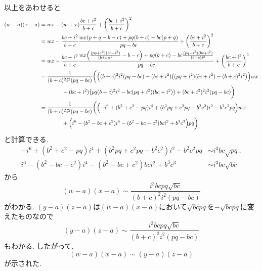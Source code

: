 \begin{ifsol*}
以上をあわせると
\begin{align*}
(w-a)(x-a)
&=wx-(w+x)\frac{bc+i^2}{b+c}+\biggl(\frac{bc+i^2}{b+c}\biggr)^2\\
&=wx-\frac{bc+i^2}{b+c}\frac{wx(p+q-b-c)+pq(b+c)-bc(p+q)}{pq-bc}+\biggl(\frac{bc+i^2}{b+c}\biggr)^2\\
&=wx-\frac{bc+i^2}{b+c}\frac{wx\Bigl(\frac{(pq+i^2)(bc+i^2)}{(b+c)i^2}-b-c\Bigr)+pq(b+c)-bc\frac{(pq+i^2)(bc+i^2)}{(b+c)i^2}}{pq-bc}+\biggl(\frac{bc+i^2}{b+c}\biggr)^2\\
&=\frac 1{(b+c)^2i^2(pq-bc)}\biggl(\Bigl((b+c)^2i^2(pq-bc)-(bc+i^2)\bigl((pq+i^2)(bc+i^2)-(b+c)^2i^2\bigr)\Bigr)wx\\
&\qquad\qquad-(bc+i^2)\bigl(pq(b+c)^2i^2-bc(pq+i^2)(bc+i^2)\bigr)+(bc+i^2)^2i^2(pq-bc)\biggr)\\
&=\frac 1{(b+c)^2i^2(pq-bc)}\biggl(\Bigl(-i^6+(b^2+c^2-pq)i^4+(b^2pq+c^2pq-b^2c^2)i^2-b^2c^2pq\Bigr)wx\\
&\qquad\qquad+\Bigl(i^6-(b^2-bc+c^2)i^4-(b^2-bc+c^2)bci^2+b^3c^3\Bigr)pq\biggr)
\end{align*}
と計算できる.
\begin{align*}
-i^6+(b^2+c^2-pq)i^4+(b^2pq+c^2pq-b^2c^2)i^2-b^2c^2pq&\sim i^3bc\sqrt{pq},\\
i^6-(b^2-bc+c^2)i^4-(b^2-bc+c^2)bci^2+b^3c^3&\sim i^3bc\sqrt{bc}
\end{align*}
から
\[(w-a)(x-a)\sim\frac{i^3bcpq\sqrt{bc}}{(b+c)^2i^2(pq-bc)}\]
がわかる.
$(y-a)(z-a)$は$(w-a)(x-a)$において$\sqrt{bcpq}$を$-\sqrt{bcpq}$に変えたものなので
\[(y-a)(z-a)\sim\frac{i^3bcpq\sqrt{bc}}{(b+c)^2i^2(pq-bc)}\]
もわかる.
したがって,
\[(w-a)(x-a)\sim(y-a)(z-a)\]
が示された.
\end{ifsol*}